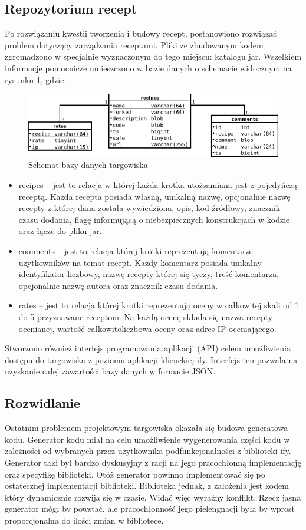 \documentclass[11pt,a4paper,polish,thesis]{dcsbook}
\begin{document}
\subsection{Repozytorium recept}
Po rozwiązaniu kwestii tworzenia i budowy recept, postanowiono rozwiązać problem dotyczący zarządzania receptami. Pliki ze zbudowanym kodem zgromadzono w specjalnie
wyznaczonym do tego miejscu: katalogu jar. Wszelkiem informacje pomocnicze umieszczono w bazie danych o schemacie widocznym na rysunku \ref{fig:market_db}, gdzie:
\begin{figure}[p]
  \centering
  \includegraphics[scale=0.7]{./resources/market_db.png}
  \caption{Schemat bazy danych targowiska}
  \label{fig:market_db}
\end{figure}
\begin{itemize}
\item recipes -- jest to relacja w której każda krotka utożsamiana jest z pojedyńczą receptą. Każda recepta posiada własną, unikalną nazwę, opcjonalnie nazwę recepty
z której dana została wywiedziona, opis, kod źródłowy, znacznik czasu dodania, flagę informującą o niebezpiecznych konstrukcjach w kodzie oraz łącze do pliku jar.
\item comments -- jest to relacja której krotki reprezentują komentarze użytkowników na temat recept. Każdy komentarz posiada unikalny identyfikator liczbowy, nazwę
recepty której się tyczy, treść komentarza, opcjonalnie nazwę autora oraz znacznik czasu dodania.
\item rates -- jest to relacja której krotki reprezentują oceny w całkowitej skali od 1 do 5 przyznawane receptom. Na każdą ocenę składa się nazwa recepty ocenianej,
wartość całkowitoliczbowa oceny oraz adres IP oceniającego.
\end{itemize}
Stworzono również interfejs programowania aplikacji (API) celem umożliwienia dostępu do targowiska z poziomu aplikacji klienckiej if{y}. Interfejs ten pozwala na
uzyskanie całej zawartości bazy danych w formacie JSON.
\subsection{Rozwidlanie}
Ostatnim problemem projektowym targowiska okazała się budowa generatowa kodu. Generator kodu miał na celu umożliwienie wygenerowania części kodu w zależności od
wybranych przez użytkownika podfunkcjonalności z biblioteki if{y}. Generator taki był bardzo dyskusyjny z racji na jego pracochłonną implementację oraz specyfikę
biblioteki. Otóż generator powinno implementować się po ostatecznej implementacji biblioteki. Biblioteka jednak, z założenia jest kodem który dynamicznie rozwija
się w czasie. Widać więc wyraźny konflikt. Rzecz jasna generator mógł by powstać, ale pracochłonność jego pielengnacji była by wprost proporcjonalna do ilości zmian
w bibliotece.
\end{document}
